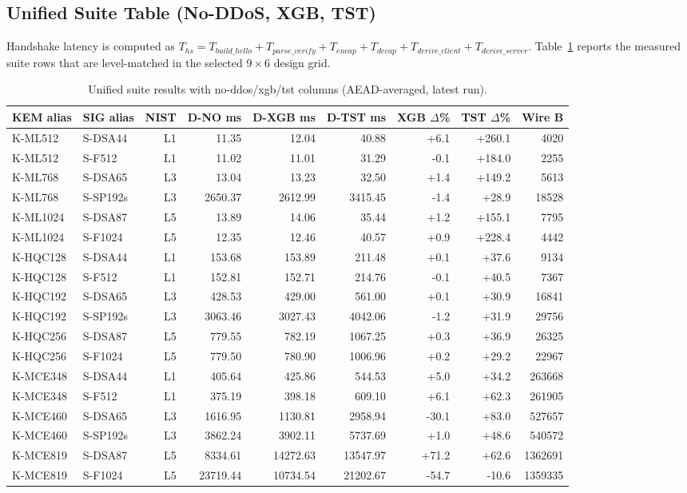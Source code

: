 
\subsection{Unified Suite Table (No-DDoS, XGB, TST)}
Handshake latency is computed as
$T_{hs}=T_{build\_hello}+T_{parse\_verify}+T_{encap}+T_{decap}+T_{derive\_client}+T_{derive\_server}$.
Table~\ref{tab:res-unified-manual} reports the measured suite rows that are level-matched in the selected 9\,$\times$\,6 design grid.

\begin{table}[t]
\centering
\caption{Unified suite results with no-ddos/xgb/tst columns (AEAD-averaged, latest run).}
\footnotesize
\setlength{\tabcolsep}{2.5pt}
\begin{tabular}{@{}llrrrrrrr@{}}\toprule
KEM alias & SIG alias & NIST & D-NO ms & D-XGB ms & D-TST ms & XGB $\Delta$\% & TST $\Delta$\% & Wire B \\ \midrule
K-ML512 & S-DSA44 & L1 & 11.35 & 12.04 & 40.88 & +6.1 & +260.1 & 4020 \\
K-ML512 & S-F512 & L1 & 11.02 & 11.01 & 31.29 & -0.1 & +184.0 & 2255 \\
K-ML768 & S-DSA65 & L3 & 13.04 & 13.23 & 32.50 & +1.4 & +149.2 & 5613 \\
K-ML768 & S-SP192s & L3 & 2650.37 & 2612.99 & 3415.45 & -1.4 & +28.9 & 18528 \\
K-ML1024 & S-DSA87 & L5 & 13.89 & 14.06 & 35.44 & +1.2 & +155.1 & 7795 \\
K-ML1024 & S-F1024 & L5 & 12.35 & 12.46 & 40.57 & +0.9 & +228.4 & 4442 \\
K-HQC128 & S-DSA44 & L1 & 153.68 & 153.89 & 211.48 & +0.1 & +37.6 & 9134 \\
K-HQC128 & S-F512 & L1 & 152.81 & 152.71 & 214.76 & -0.1 & +40.5 & 7367 \\
K-HQC192 & S-DSA65 & L3 & 428.53 & 429.00 & 561.00 & +0.1 & +30.9 & 16841 \\
K-HQC192 & S-SP192s & L3 & 3063.46 & 3027.43 & 4042.06 & -1.2 & +31.9 & 29756 \\
K-HQC256 & S-DSA87 & L5 & 779.55 & 782.19 & 1067.25 & +0.3 & +36.9 & 26325 \\
K-HQC256 & S-F1024 & L5 & 779.50 & 780.90 & 1006.96 & +0.2 & +29.2 & 22967 \\
K-MCE348 & S-DSA44 & L1 & 405.64 & 425.86 & 544.53 & +5.0 & +34.2 & 263668 \\
K-MCE348 & S-F512 & L1 & 375.19 & 398.18 & 609.10 & +6.1 & +62.3 & 261905 \\
K-MCE460 & S-DSA65 & L3 & 1616.95 & 1130.81 & 2958.94 & -30.1 & +83.0 & 527657 \\
K-MCE460 & S-SP192s & L3 & 3862.24 & 3902.11 & 5737.69 & +1.0 & +48.6 & 540572 \\
K-MCE819 & S-DSA87 & L5 & 8334.61 & 14272.63 & 13547.97 & +71.2 & +62.6 & 1362691 \\
K-MCE819 & S-F1024 & L5 & 23719.44 & 10734.54 & 21202.67 & -54.7 & -10.6 & 1359335 \\
\bottomrule\end{tabular}
\label{tab:res-unified-manual}
\end{table}


